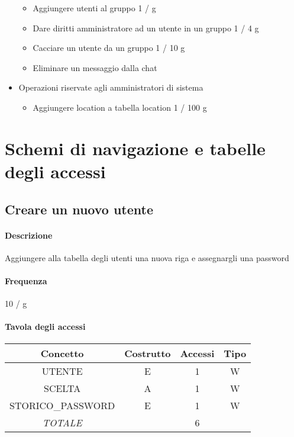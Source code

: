 \documentclass[a4paper,12pt]{report}
\begin{document}
\begin{itemize}
{\begin{itemize}
        \item Aggiungere utenti al gruppo 1 / g
        \item Dare diritti amministratore ad un utente in un gruppo 1 / 4 g
        \item Cacciare un utente da un gruppo 1 / 10 g
        \item Eliminare un messaggio dalla chat
      \end{itemize}
    }
  \item {
      Operazioni riservate agli amministratori di sistema
      \begin{itemize}
        \item Aggiungere location a tabella location 1 / 100 g
      \end{itemize} 
    }
\end{itemize}
 
\section{Schemi di navigazione e tabelle degli accessi}

\subsection{Creare un nuovo utente} \label{nuovo_utente}
\paragraph{Descrizione} Aggiungere alla tabella degli utenti una nuova riga e assegnargli una password 
\paragraph{Frequenza} 10 / g 
\begin{table}[H]
\paragraph{Tavola degli accessi\newline}
\begin{tabular}{|c|c|c|c|}
\hline
Concetto          & Costrutto & Accessi & Tipo \\ \hline
UTENTE            & E         & 1       & W    \\ \hline
SCELTA           & A         & 1       & W    \\ \hline
STORICO\_PASSWORD & E         & 1       & W    \\ \hline
\textit{TOTALE}   &           & 6       &      \\ \hline
\end{tabular}
\end{table}
\end{document}
